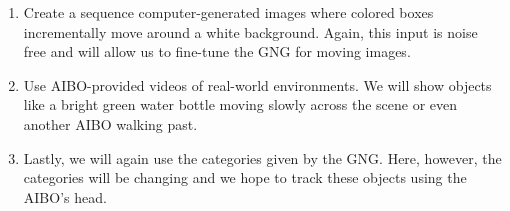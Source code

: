 \documentclass{article}
\begin{document}
\begin{enumerate}
  \item Create a sequence computer-generated images where colored boxes incrementally move around a white background. Again, this input is noise free and will allow us to fine-tune the GNG for moving images.
  \item Use AIBO-provided videos of real-world environments. We will show objects like a bright green water bottle moving slowly across the scene or even another AIBO walking past.
  \item Lastly, we will again use the categories given by the GNG. Here, however, the categories will be changing and we hope to track these objects using the AIBO's head.
\end{enumerate}
\end{document}
